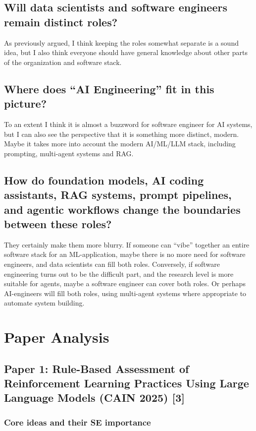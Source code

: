 \documentclass[11pt]{article}
\begin{document}
\subsection{Will data scientists and software engineers remain distinct roles?}

As previously argued, I think keeping the roles somewhat separate is a sound idea, but I also think everyone should have general knowledge about other parts of the organization and software stack. 

\subsection{Where does ``AI Engineering'' fit in this picture?}

To an extent I think it is almost a buzzword for software engineer for AI systems, but I can also see the perspective that it is something more distinct, modern. Maybe it takes more into account the modern AI/ML/LLM stack, including prompting, multi-agent systems and RAG. 

\subsection{How do foundation models, AI coding assistants, RAG systems, prompt pipelines, and agentic workflows change the boundaries between these roles?}

They certainly make them more blurry. If someone can ``vibe'' together an entire software stack for an ML-application, maybe there is no more need for software engineers, and data scientists can fill both roles. Conversely, if software engineering turns out to be the difficult part, and the research level is more suitable for agents, maybe a software engineer can cover both roles. Or perhaps AI-engineers will fill both roles, using multi-agent systems where appropriate to automate system building. 

\section{Paper Analysis}

\subsection{Paper 1: Rule-Based Assessment of Reinforcement Learning Practices Using Large Language Models (CAIN 2025) [3]}

\subsubsection{Core ideas and their SE importance}
\end{document}
